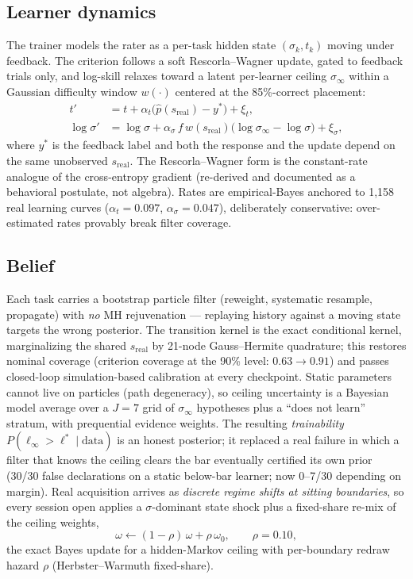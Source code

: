 \documentclass[11pt]{article}
\newcommand{\ellstar}{\ell^{*}}
\begin{document}
\subsection{Learner dynamics}
The trainer models the rater as a per-task hidden state $(\sigma_k, t_k)$ moving
under feedback. The criterion follows a soft Rescorla--Wagner update, gated to
feedback trials only, and log-skill relaxes toward a latent per-learner ceiling
$\sigma_\infty$ within a Gaussian difficulty window $w(\cdot)$ centered at the
85\%-correct placement:
\begin{align}
t' &= t + \alpha_t\big(\hat p(s_{\mathrm{real}}) - y^{*}\big) + \xi_t,\\
\log \sigma' &= \log \sigma + \alpha_\sigma\, f\, w(s_{\mathrm{real}})\big(\log
\sigma_\infty - \log \sigma\big) + \xi_\sigma,
\end{align}
where $y^{*}$ is the feedback label and both the response and the update depend
on the same unobserved $s_{\mathrm{real}}$. The Rescorla--Wagner form is the
constant-rate analogue of the cross-entropy gradient (re-derived and documented
as a behavioral postulate, not algebra). Rates are empirical-Bayes anchored to
1{,}158 real learning curves ($\alpha_t = 0.097$, $\alpha_\sigma = 0.047$),
deliberately conservative: over-estimated rates provably break filter coverage.

\subsection{Belief}
Each task carries a bootstrap particle filter (reweight, systematic resample,
propagate) with \emph{no} MH rejuvenation --- replaying history against a moving
state targets the wrong posterior. The transition kernel is the exact
conditional kernel, marginalizing the shared $s_{\mathrm{real}}$ by 21-node
Gauss--Hermite quadrature; this restores nominal coverage (criterion coverage at
the 90\% level: $0.63 \to 0.91$) and passes closed-loop simulation-based
calibration at every checkpoint. Static parameters cannot live on particles
(path degeneracy), so ceiling uncertainty is a Bayesian model average over a
$J=7$ grid of $\sigma_\infty$ hypotheses plus a ``does not learn'' stratum, with
prequential evidence weights. The resulting \emph{trainability}
$P(\ell_\infty > \ellstar \mid \text{data})$ is an honest posterior; it replaced
a real failure in which a filter that knows the ceiling clears the bar
eventually certified its own prior (30/30 false declarations on a static
below-bar learner; now 0--7/30 depending on margin). Real acquisition arrives as
\emph{discrete regime shifts at sitting boundaries}, so every session open
applies a $\sigma$-dominant state shock plus a fixed-share re-mix of the ceiling
weights,
\begin{equation}
\omega \leftarrow (1-\rho)\,\omega + \rho\,\omega_0, \qquad \rho = 0.10,
\end{equation}
the exact Bayes update for a hidden-Markov ceiling with per-boundary redraw
hazard $\rho$ (Herbster--Warmuth fixed-share).
\end{document}
